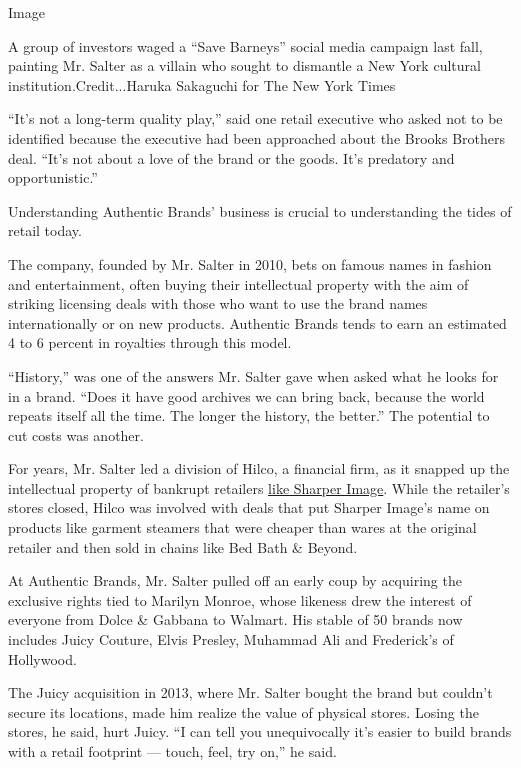 Image

A group of investors waged a ``Save Barneys'' social media campaign last
fall, painting Mr. Salter as a villain who sought to dismantle a New
York cultural institution.Credit...Haruka Sakaguchi for The New York
Times

``It's not a long-term quality play,'' said one retail executive who
asked not to be identified because the executive had been approached
about the Brooks Brothers deal. ``It's not about a love of the brand or
the goods. It's predatory and opportunistic.''

Understanding Authentic Brands' business is crucial to understanding the
tides of retail today.

The company, founded by Mr. Salter in 2010, bets on famous names in
fashion and entertainment, often buying their intellectual property with
the aim of striking licensing deals with those who want to use the brand
names internationally or on new products. Authentic Brands tends to earn
an estimated 4 to 6 percent in royalties through this model.

``History,'' was one of the answers Mr. Salter gave when asked what he
looks for in a brand. ``Does it have good archives we can bring back,
because the world repeats itself all the time. The longer the history,
the better.'' The potential to cut costs was another.

For years, Mr. Salter led a division of Hilco, a financial firm, as it
snapped up the intellectual property of bankrupt retailers
\href{https://www.nytimes3xbfgragh.onion/2009/01/19/technology/companies/19sharper.html}{like
Sharper Image}. While the retailer's stores closed, Hilco was involved
with deals that put Sharper Image's name on products like garment
steamers that were cheaper than wares at the original retailer and then
sold in chains like Bed Bath \& Beyond.

At Authentic Brands, Mr. Salter pulled off an early coup by acquiring
the exclusive rights tied to Marilyn Monroe, whose likeness drew the
interest of everyone from Dolce \& Gabbana to Walmart. His stable of 50
brands now includes Juicy Couture, Elvis Presley, Muhammad Ali and
Frederick's of Hollywood.

The Juicy acquisition in 2013, where Mr. Salter bought the brand but
couldn't secure its locations, made him realize the value of physical
stores. Losing the stores, he said, hurt Juicy. ``I can tell you
unequivocally it's easier to build brands with a retail footprint ---
touch, feel, try on,'' he said.


